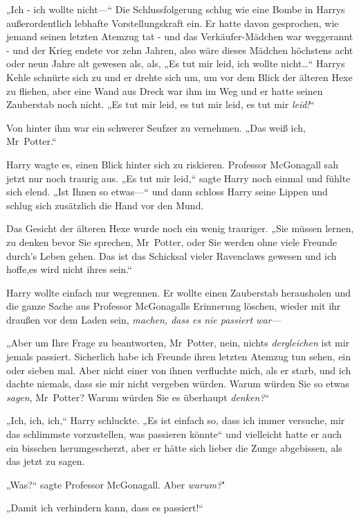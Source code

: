 {„Ich - ich wollte nicht—“ Die Schlussfolgerung schlug wie eine Bombe in Harrys außerordentlich lebhafte Vorstellungskraft ein. Er hatte davon gesprochen, wie jemand seinen letzten Atemzug tat - und das Verkäufer-Mädchen war weggerannt - und der Krieg endete vor zehn Jahren, also wäre dieses Mädchen höchstens acht oder neun Jahre alt gewesen als, als, „Es tut mir leid, ich wollte nicht…“ Harrys Kehle schnürte sich zu und er drehte sich um, um vor dem Blick der älteren Hexe zu fliehen, aber eine Wand aus Dreck war ihm im Weg und er hatte seinen Zauberstab noch nicht. „Es tut mir leid, es tut mir leid, es tut mir \emph{leid!}“

Von hinter ihm war ein schwerer Seufzer zu vernehmen. „Das weiß ich, Mr~Potter.“

Harry wagte es, einen Blick hinter sich zu riskieren. Professor McGonagall sah jetzt nur noch traurig aus. „Es tut mir leid,“ sagte Harry noch einmal und fühlte sich elend. „Ist Ihnen so etwas—“ und dann schloss Harry seine Lippen und schlug sich zusätzlich die Hand vor den Mund.

Das Gesicht der älteren Hexe wurde noch ein wenig trauriger. „Sie müssen lernen, zu denken bevor Sie sprechen, Mr~Potter, oder Sie werden ohne viele Freunde durch's Leben gehen. Das ist das Schicksal vieler Ravenclaws gewesen und ich hoffe,es wird nicht ihres sein.“

Harry wollte einfach nur wegrennen. Er wollte einen Zauberstab herausholen und die ganze Sache aus Professor McGonagalls Erinnerung löschen, wieder mit ihr draußen vor dem Laden sein, \emph{machen, dass es nie passiert war—}

„Aber um Ihre Frage zu beantworten, Mr~Potter, nein, nichts \emph{dergleichen} ist mir jemals passiert. Sicherlich habe ich Freunde ihren letzten Atemzug tun sehen, ein oder sieben mal. Aber nicht einer von ihnen verfluchte mich, als er starb, und ich dachte niemals, dass sie mir nicht vergeben würden. Warum würden Sie so etwas \emph{sagen}, Mr~Potter? Warum würden Sie es überhaupt \emph{denken?}“

„Ich, ich, ich,“ Harry schluckte. „Es ist einfach so, dass ich immer versuche, mir das schlimmste vorzustellen, was passieren könnte“ und vielleicht hatte er auch ein bisschen herumgescherzt, aber er hätte sich lieber die Zunge abgebissen, als das jetzt zu sagen.

„Was?“ sagte Professor McGonagall. Aber \emph{warum?}"

„Damit ich verhindern kann, dass es passiert!“

}
